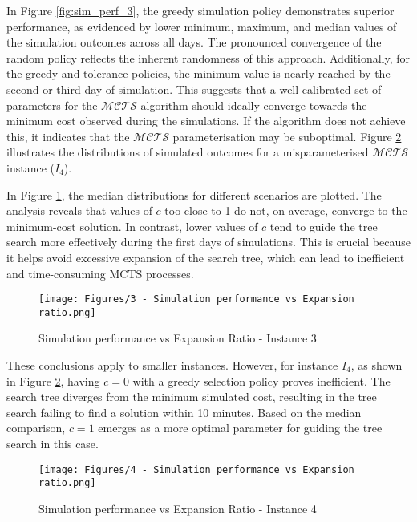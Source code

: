 In Figure \ref{fig:sim_perf_3}, the greedy simulation policy demonstrates superior performance, as evidenced by lower minimum, maximum, and median values of the simulation outcomes across all days. The pronounced convergence of the random policy reflects the inherent randomness of this approach. Additionally, for the greedy and tolerance policies, the minimum value is nearly reached by the second or third day of simulation. This suggests that a well-calibrated set of parameters for the $\mathcal{MCTS}$ algorithm should ideally converge towards the minimum cost observed during the simulations. If the algorithm does not achieve this, it indicates that the $\mathcal{MCTS}$ parameterisation may be suboptimal. 
Figure \ref{fig:sim_perf_vs_c_4} illustrates the distributions of simulated outcomes for a misparameterised $\mathcal{MCTS}$ instance ($I_4$). 

In Figure \ref{fig:sim_perf_vs_c_3}, the median distributions for different scenarios are plotted. The analysis reveals that values of $c$ too close to 1 do not, on average, converge to the minimum-cost solution. In contrast, lower values of $c$ tend to guide the tree search more effectively during the first days of simulations. This is crucial because it helps avoid excessive expansion of the search tree, which can lead to inefficient and time-consuming MCTS processes.

\begin{figure}[!ht]
    \centering
    \texttt{[image: Figures/3 - Simulation performance vs Expansion ratio.png]}
    \caption{Simulation performance vs Expansion Ratio - Instance 3}
    \label{fig:sim_perf_vs_c_3}
\end{figure}

These conclusions apply to smaller instances. However, for instance $I_4$, as shown in Figure \ref{fig:sim_perf_vs_c_4}, having $c=0$ with a greedy selection policy proves inefficient. The search tree diverges from the minimum simulated cost, resulting in the tree search failing to find a solution within 10 minutes. Based on the median comparison, $c=1$ emerges as a more optimal parameter for guiding the tree search in this case.

\begin{figure}[!ht]
    \centering
    \texttt{[image: Figures/4 - Simulation performance vs Expansion ratio.png]}
    \caption{Simulation performance vs Expansion Ratio - Instance 4}
    \label{fig:sim_perf_vs_c_4}
\end{figure}

